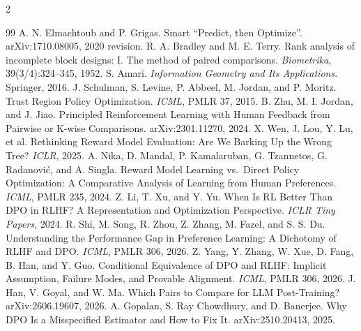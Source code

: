 \documentclass[UTF8,11pt,a4paper,fontset=none]{ctexart}
\begin{document}
\enlargethispage{0.8\baselineskip}
\begin{multicols}{2}
\setlength{\columnsep}{4mm}
\begin{thebibliography}{99}
\fontsize{6.8}{6.9}\selectfont
\setlength{\itemsep}{-0.25em}
\setlength{\parsep}{0pt}
A. N. Elmachtoub and P. Grigas. Smart ``Predict, then Optimize''. arXiv:1710.08005, 2020 revision.
R. A. Bradley and M. E. Terry. Rank analysis of incomplete block designs: I. The method of paired comparisons. \emph{Biometrika}, 39(3/4):324--345, 1952.
S. Amari. \emph{Information Geometry and Its Applications}. Springer, 2016.
J. Schulman, S. Levine, P. Abbeel, M. Jordan, and P. Moritz. Trust Region Policy Optimization. \emph{ICML}, PMLR 37, 2015.
B. Zhu, M. I. Jordan, and J. Jiao. Principled Reinforcement Learning with Human Feedback from Pairwise or K-wise Comparisons. arXiv:2301.11270, 2024.
X. Wen, J. Lou, Y. Lu, et al. Rethinking Reward Model Evaluation: Are We Barking Up the Wrong Tree? \emph{ICLR}, 2025.
A. Nika, D. Mandal, P. Kamalaruban, G. Tzannetos, G. Radanovi\'c, and A. Singla. Reward Model Learning vs.\ Direct Policy Optimization: A Comparative Analysis of Learning from Human Preferences. \emph{ICML}, PMLR 235, 2024.
Z. Li, T. Xu, and Y. Yu. When Is RL Better Than DPO in RLHF? A Representation and Optimization Perspective. \emph{ICLR Tiny Papers}, 2024.
R. Shi, M. Song, R. Zhou, Z. Zhang, M. Fazel, and S. S. Du. Understanding the Performance Gap in Preference Learning: A Dichotomy of RLHF and DPO. \emph{ICML}, PMLR 306, 2026.
Z. Yang, Y. Zhang, W. Xue, D. Fang, B. Han, and Y. Guo. Conditional Equivalence of DPO and RLHF: Implicit Assumption, Failure Modes, and Provable Alignment. \emph{ICML}, PMLR 306, 2026.
J. Han, V. Goyal, and W. Ma. Which Pairs to Compare for LLM Post-Training? arXiv:2606.19607, 2026.
A. Gopalan, S. Ray Chowdhury, and D. Banerjee. Why DPO Is a Misspecified Estimator and How to Fix It. arXiv:2510.20413, 2025.
\end{thebibliography}
\end{multicols}
\end{document}
